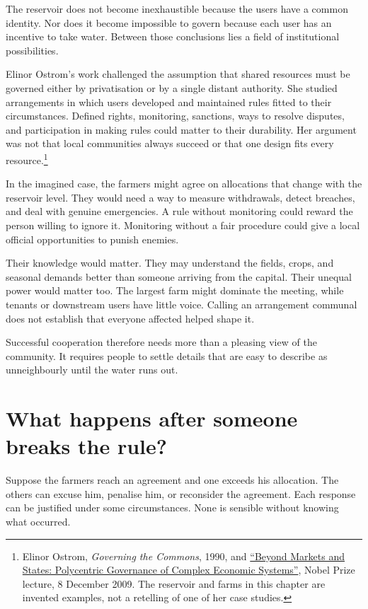 \documentclass[12pt,a4paper]{book}
\begin{document}
The reservoir does not become inexhaustible because the users have a common identity. Nor does it become impossible to govern because each user has an incentive to take water. Between those conclusions lies a field of institutional possibilities.

Elinor Ostrom's work challenged the assumption that shared resources must be governed either by privatisation or by a single distant authority. She studied arrangements in which users developed and maintained rules fitted to their circumstances. Defined rights, monitoring, sanctions, ways to resolve disputes, and participation in making rules could matter to their durability. Her argument was not that local communities always succeed or that one design fits every resource.\footnote{Elinor Ostrom, \emph{Governing the Commons}, 1990, and \href{https://www.nobelprize.org/prizes/economic-sciences/2009/ostrom/lecture/}{``Beyond Markets and States: Polycentric Governance of Complex Economic Systems''}, Nobel Prize lecture, 8 December 2009. The reservoir and farms in this chapter are invented examples, not a retelling of one of her case studies.}

In the imagined case, the farmers might agree on allocations that change with the reservoir level. They would need a way to measure withdrawals, detect breaches, and deal with genuine emergencies. A rule without monitoring could reward the person willing to ignore it. Monitoring without a fair procedure could give a local official opportunities to punish enemies.

Their knowledge would matter. They may understand the fields, crops, and seasonal demands better than someone arriving from the capital. Their unequal power would matter too. The largest farm might dominate the meeting, while tenants or downstream users have little voice. Calling an arrangement communal does not establish that everyone affected helped shape it.

Successful cooperation therefore needs more than a pleasing view of the community. It requires people to settle details that are easy to describe as unneighbourly until the water runs out.

\section*{What happens after someone breaks the rule?}

Suppose the farmers reach an agreement and one exceeds his allocation. The others can excuse him, penalise him, or reconsider the agreement. Each response can be justified under some circumstances. None is sensible without knowing what occurred.
\end{document}
